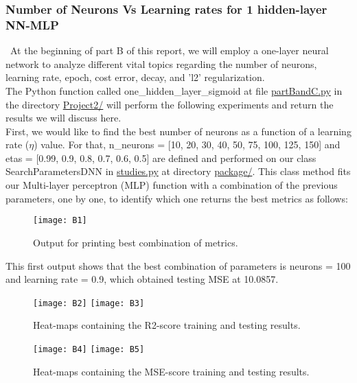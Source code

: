 \subsubsection{Number of Neurons Vs Learning rates for 1 hidden-layer NN-MLP}
\label{chap:Number of Neurons Vs Learning rates for 1 hidden-layer NN-MLP}

\qquad \, At the beginning of part B of this report, we will employ a one-layer neural network to analyze different vital topics regarding the number of neurons, learning rate, epoch, cost error, decay, and 'l2' regularization.\\

The Python function called one\_hidden\_layer\_sigmoid at file \href{https://github.com/fabiorodp/UiO-FYS-STK4155/blob/master/Project2/partBandC.py}{partBandC.py} in the directory \href{https://github.com/fabiorodp/UiO-FYS-STK4155/blob/master/Project2/}{Project2/} will perform the following experiments and return the results we will discuss here.\\

First, we would like to find the best number of neurons as a function of a learning rate ($\eta$) value. For that, n\_neurons = [10, 20, 30, 40, 50, 75, 100, 125, 150] and etas = [0.99, 0.9, 0.8, 0.7, 0.6, 0.5] are defined and performed on our class SearchParametersDNN in \href{https://github.com/fabiorodp/UiO-FYS-STK4155/blob/master/Project2/package/studies.py}{studies.py} at directory \href{https://github.com/fabiorodp/UiO-FYS-STK4155/blob/master/Project2/package/}{package/}. This class method fits our Multi-layer perceptron (MLP) function with a combination of the previous parameters, one by one, to identify which one returns the best metrics as follows:

\begin{figure}[H]
\label{fig:B1}
\centering
\texttt{[image: B1]}
\caption{Output for printing best combination of metrics.}
\end{figure}

This first output shows that the best combination of parameters is neurons = 100 and learning rate = 0.9, which obtained testing MSE at 10.0857.

\begin{figure}[H]
\label{fig:B2}
\centering
\texttt{[image: B2]}
\texttt{[image: B3]}
\caption{Heat-maps containing the R2-score training and testing results.}
\end{figure}

\begin{figure}[H]
\label{fig:B3}
\centering
\texttt{[image: B4]}
\texttt{[image: B5]}
\caption{Heat-maps containing the MSE-score training and testing results.}
\end{figure}

